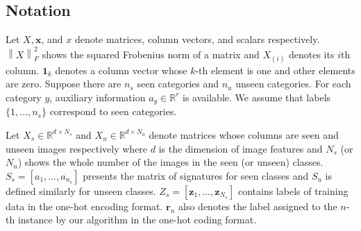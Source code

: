 \documentclass[10pt,twocolumn,letterpaper]{article}
\newcommand{\norm}[1]{\left \lVert #1 \right \rVert_{F}^2}
\begin{document}
\subsection{Notation}
Let $X, \mathbf{x}$, and $x$ denote matrices, column vectors, and scalars respectively. $\norm{X}$ shows the squared Frobenius norm of a matrix and
$X_{(i)}$ denotes its $i$th column. $\mathbf{1}_k$ denotes a column vector whose $k$-th element is one and other elements are zero.
Suppose there are $n_s$ seen categories and $n_u$ unseen categories. For each category $y$,
auxiliary information $a_y \in \mathbb{R}^r$ is available. We assume that labels $\{1, \ldots, n_s \}$ correspond to seen categories.

Let $X_s \in \mathbb{R}^{d \times N_s}$ and $X_u \in \mathbb{R}^{d \times N_u}$
denote matrices whose columns are seen and unseen images respectively where $d$ is the dimension of image features and $N_s$ (or $N_u$) shows the whole number of the images in the seen (or unseen) classes.
$S_s = [a_1, \ldots, a_{n_s}]$ presents the matrix of signatures for seen classes and $S_u$ is defined similarly for unseen classes.
$Z_s = [ \mathbf{z}_1, \ldots, \mathbf{z}_{N_s} ]$
contains labels of training data in the one-hot encoding format. $\mathbf{r}_n$ also denotes the label assigned to the $n$-th instance by our algorithm in the one-hot coding format.
\end{document}
